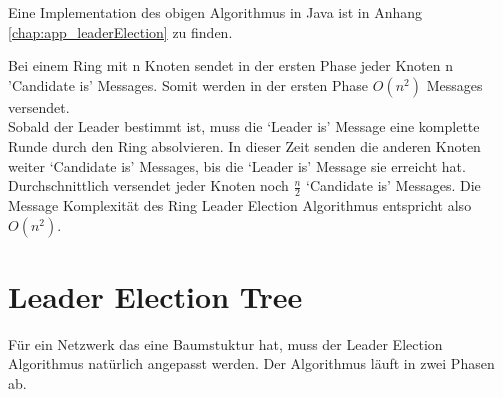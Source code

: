 Eine Implementation des obigen Algorithmus in Java ist in Anhang \ref{chap:app_leaderElection} zu finden.

Bei einem Ring mit n Knoten sendet in der ersten Phase jeder Knoten n 'Candidate is' Messages. Somit werden in der ersten Phase $O(n^{2})$ Messages versendet.\\
Sobald der Leader bestimmt ist, muss die `Leader is' Message eine komplette Runde durch den Ring absolvieren. In dieser Zeit senden die anderen Knoten weiter `Candidate is' Messages, bis die `Leader is' Message sie erreicht hat. Durchschnittlich versendet jeder Knoten noch \( \frac{n}{2} \) `Candidate is' Messages. Die Message Komplexität des Ring Leader Election Algorithmus entspricht also $O(n^{2})$.



\section{Leader Election Tree} \label{sec_leaderElectionTree}
Für ein Netzwerk das eine Baumstuktur hat, muss der Leader Election Algorithmus natürlich angepasst werden. Der Algorithmus läuft in zwei Phasen ab.
